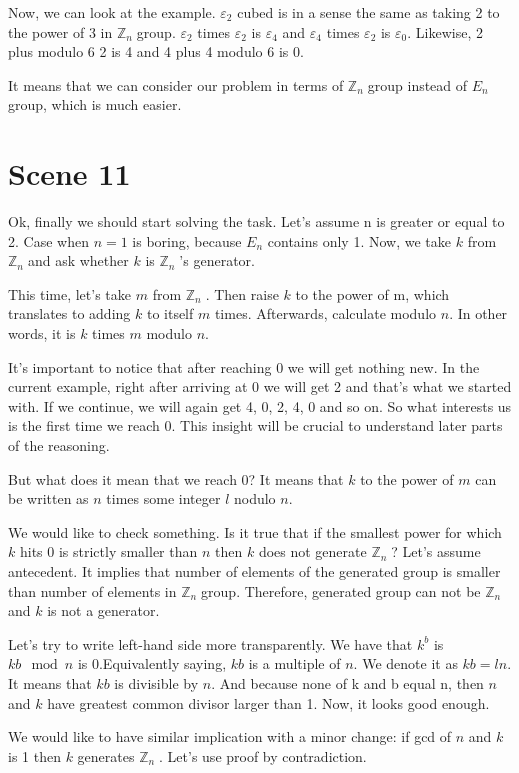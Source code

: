 \documentclass[12pt]{article}
\newcommand{\e}{\varepsilon}
\newcommand{\zn}{$\mathbb{Z}_n\;$}
\newcommand{\mybox}[1]{\colorbox{Goldenrod2}{#1}}
\begin{document}
    Now, we can look at the example. $\e_2$ cubed is in a sense the same as taking 2 to the power of 3 in \zn group. $\e_2$ times $\e_2$ is $\e_4$ and $\e_4$ times $\e_2$ is $\e_0$. Likewise, 2 plus modulo 6 2 is 4 and 4 plus 4 modulo 6 is 0.

    It means that we can consider our problem in terms of \zn group instead of $E_n$ group, which is much easier.

\section*{\mybox{Scene 11}}
    Ok, finally we should start solving the task. Let's assume n is greater or equal to 2. Case when $n=1$ is boring, because $E_n$ contains only 1. Now, we take $k$ from \zn and ask whether $k$ is \zn's generator.

    This time, let's take $m$ from \zn. Then raise $k$ to the power of m, which translates to adding $k$ to itself $m$ times. Afterwards, calculate modulo $n$. In other words, it is $k$ times $m$ modulo $n$.

    It's important to notice that after reaching 0 we will get nothing new. In the current example, right after arriving at 0 we will get 2 and that's what we started with. If we continue, we will again get 4, 0, 2, 4, 0 and so on. So what interests us is the first time we reach 0. This insight will be crucial to understand later parts of the reasoning.

    But what does it mean that we reach 0? It means that $k$ to the power of $m$ can be written as $n$ times some integer $l$ nodulo $n$.

    We would like to check something. Is it true that if the smallest power for which $k$ hits 0 is strictly smaller than $n$ then $k$ does not generate \zn? Let's assume antecedent. It implies that number of elements of the generated group is smaller than number of elements in \zn group. Therefore, generated group can not be \zn and $k$ is not a generator.

    Let's try to write left-hand side more transparently. We have that $k^b$ is $kb\mod n$ is 0.Equivalently saying, $kb$ is a multiple of $n$. We denote it as $kb = ln$. It means that $kb$ is divisible by $n$. And because none of k and b equal n, then $n$ and $k$ have greatest common divisor larger than 1. Now, it looks good enough.



    We would like to have similar implication with a minor change: if gcd of $n$ and $k$ is 1 then $k$ generates \zn. Let's use proof by contradiction.
    
\end{document}
